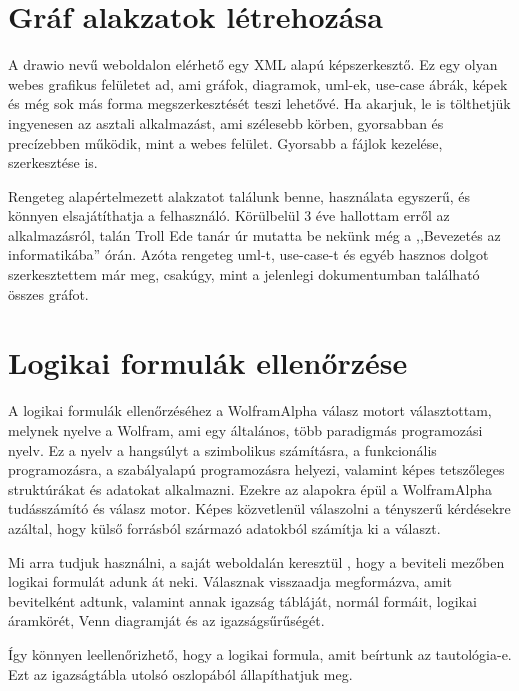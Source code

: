 \documentclass[
]{thesis-ekf}
\theoremstyle{definition}
\theoremstyle{remark}
\begin{document}
 	\section{Gráf alakzatok létrehozása}

	A drawio nevű weboldalon \cite{link-drawio} elérhető egy \textsc{XML} alapú képszerkesztő. Ez egy olyan webes grafikus felületet ad, ami gráfok, diagramok, uml-ek, use-case ábrák, képek és még sok más forma megszerkesztését teszi lehetővé. Ha akarjuk, le is tölthetjük ingyenesen az asztali alkalmazást, ami szélesebb körben, gyorsabban és precízebben működik, mint a webes felület. Gyorsabb a fájlok kezelése, szerkesztése is.
	
	Rengeteg alapértelmezett alakzatot találunk benne, használata egyszerű, és könnyen elsajátíthatja a felhasználó. Körülbelül 3 éve hallottam erről az alkalmazásról, talán Troll Ede tanár úr mutatta be nekünk még a ,,Bevezetés az informatikába'' órán. Azóta rengeteg uml-t, use-case-t és egyéb hasznos dolgot szerkesztettem már meg, csakúgy, mint a jelenlegi dokumentumban található összes gráfot.
	
	\section{Logikai formulák ellenőrzése}
	
	A logikai formulák ellenőrzéséhez a WolframAlpha válasz motort választottam, melynek nyelve a Wolfram, ami egy általános, több paradigmás programozási nyelv. Ez a nyelv a hangsúlyt a szimbolikus számításra, a funkcionális programozásra, a szabályalapú programozásra helyezi, valamint képes tetszőleges struktúrákat és adatokat alkalmazni. Ezekre az alapokra épül a WolframAlpha tudásszámító és válasz motor. Képes közvetlenül válaszolni a tényszerű kérdésekre azáltal, hogy külső forrásból származó adatokból számítja ki a választ.
	
	Mi arra tudjuk használni, a saját weboldalán keresztül \cite{link-wolframalpha}, hogy a beviteli mezőben logikai formulát adunk át neki. Válasznak visszaadja megformázva, amit bevitelként adtunk, valamint annak igazság tábláját, normál formáit, logikai áramkörét, Venn diagramját és az igazságsűrűségét.
	
	Így könnyen leellenőrizhető, hogy a logikai formula, amit beírtunk az tautológia-e. Ezt az igazságtábla utolsó oszlopából állapíthatjuk meg.
	
\end{document}
